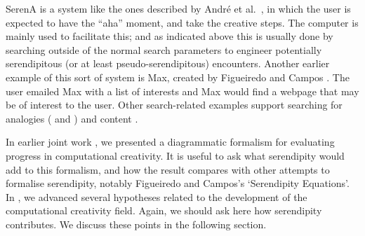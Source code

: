 {\sf SerenA} is a system like the ones described by Andr{\'e} et
al.~\cite{andre2009discovery}, in which the user is expected to have
the ``aha'' moment, and take the creative steps.  The computer is
mainly used to facilitate this; and as indicated above this is usually
done by searching outside of the normal search parameters to engineer
potentially serendipitous (or at least pseudo-serendipitous)
encounters.  Another earlier example of this sort of system is {\sf
  Max}, created by Figueiredo and Campos \citeyear{Campos2002}.  The user
emailed {\sf Max} with a list of interests and {\sf Max} would find a
webpage that may be of interest to the user.  Other search-related
examples support searching for analogies (\cite{Donoghue2002} and
\cite{Donoghue2012}) and content \cite{Iaquinta2008}.

In earlier joint work \cite{colton-assessingprogress}, we presented a
diagrammatic formalism for evaluating progress in computational
creativity.  It is useful to ask what serendipity would add to this
formalism, and how the result compares with other attempts to
formalise serendipity, notably Figueiredo and Campos's
\citeyear{Figueiredo2001} `Serendipity Equations'.
%
In \cite{stakeholder-groups-bookchapter}, we advanced several
hypotheses related to the development of the computational creativity
field.  Again, we should ask here how serendipity contributes.  We
discuss these points in the following section.
